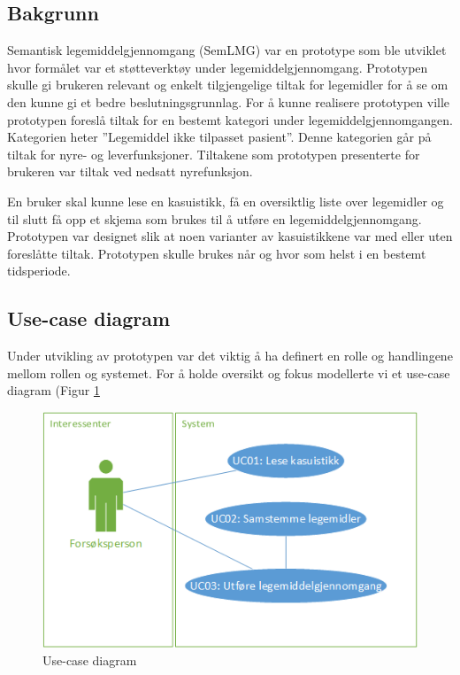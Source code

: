 \subsection{Bakgrunn}

Semantisk legemiddelgjennomgang (SemLMG) var en prototype som ble utviklet hvor formålet var et støtteverktøy under legemiddelgjennomgang. Prototypen skulle gi brukeren relevant og enkelt tilgjengelige tiltak for legemidler for å se om den kunne gi et bedre beslutningsgrunnlag. For å kunne realisere prototypen ville prototypen foreslå tiltak for en bestemt kategori under legemiddelgjennomgangen. Kategorien heter ''Legemiddel ikke tilpasset pasient''. Denne kategorien går på tiltak for nyre- og leverfunksjoner. Tiltakene som prototypen presenterte for brukeren var tiltak ved nedsatt nyrefunksjon.

En bruker skal kunne lese en kasuistikk, få en oversiktlig liste over legemidler og til slutt få opp et skjema som brukes til å utføre en legemiddelgjennomgang. Prototypen var designet slik at noen varianter av kasuistikkene var med eller uten foreslåtte tiltak. Prototypen skulle brukes når og hvor som helst i en bestemt tidsperiode.

\subsection{Use-case diagram}
Under utvikling av prototypen var det viktig å ha definert en rolle og handlingene mellom rollen og systemet. For å holde oversikt og fokus modellerte vi et use-case diagram (Figur \ref{fig:ucd}
\begin{figure}[H]
\centering
\includegraphics[width=14cm]{images/ucd.png}
\caption{Use-case diagram}
\label{fig:ucd}
\end{figure}
